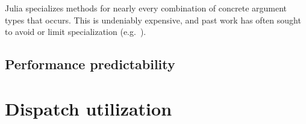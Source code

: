 Julia specializes methods for nearly every combination of concrete
argument types that occurs.
This is undeniably expensive, and past work has often sought to avoid
or limit specialization (e.g.\ \cite{Dragos:2009:CGT:1565824.1565830}).


\iffalse
\subsection{Method changes}
You can always specialize on constants, but you might want to specialize
on the current state of something that changes.
This is really difficult to do.
A system for adding methods as code is loaded provides this.
Method tables can be seen as elaborate mutable hash tables that come with
a protocol for keeping the system consistent under changes.
\fi


\subsection{Performance predictability}


\section{Dispatch utilization}

